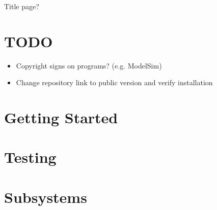 \documentclass[12pt]{article}
\begin{document}
Title page?
\pagebreak

\tableofcontents

\section{TODO}
\begin{itemize}
\item Copyright signs on programs? (e.g. ModelSim)
\item Change repository link to public version and verify installation
\end{itemize}

\section{Getting Started}


\section{Testing}

\pagebreak


\pagebreak

\section{Subsystems}

\pagebreak


\pagebreak


\pagebreak


\pagebreak
\end{document}
